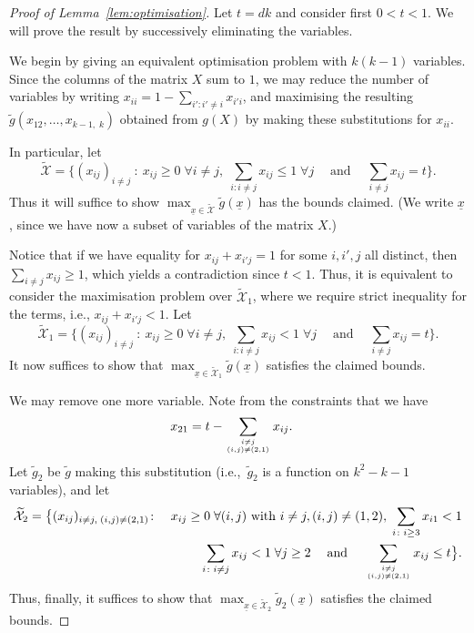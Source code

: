 \documentclass[a4paper,UKenglish,cleveref, autoref, thm-restate,numberwithinsect]{lipics-v2021}
\begin{document}
\begin{proof}[Proof of Lemma~\ref{lem:optimisation}] Let $t=dk$ and consider first $0<t<1$. We will prove the result by successively eliminating the variables. 


We begin by giving an equivalent optimisation problem with $k(k-1)$ variables. Since the columns of the matrix $X$ sum to $1$, we may reduce the number of variables by writing $x_{ii}=1-\sum_{i':i'\neq i} x_{i'i}$, and maximising the resulting $\tilde{g}(x_{12}, \ldots, x_{k-1,\; k})$ obtained from $g(X)$ by making these substitutions for $x_{ii}$. 

In particular, let
%
\begin{equation}
\widetilde{\mathcal{X}}=\big\{(x_{ij})_{i\neq j}
~\colon~ x_{ij}\geq 0 \; \forall i\neq j, \; \sum_{i\colon i\neq j}x_{ij}\leq 1 \; \forall j \; \quad\mbox{and} \quad\;
\label{eq.small_d.X}
\sum_{i\ne j} x_{ij}=t\big\}. \end{equation}
Thus it will suffice to show $\max_{\underline{x} \in \widetilde{\mathcal{X}}} \tilde{g}(\underline{x})$ has the bounds claimed. (We write $\underline{x}$, since we have now a subset of variables of the matrix $X$.)


Notice that 
if we have equality for $x_{ij}+x_{i'j}= 1$ for some $i,i',j$ all distinct, then $\sum_{i\ne j}x_{ij}\geq 1$, which yields a contradiction since $t<1$. Thus, it is equivalent to consider the maximisation problem over $\widetilde{\mathcal{X}}_1$, where we require strict inequality for the terms, i.e., $x_{ij}+x_{i'j}< 1$. Let
%
\begin{equation}
\widetilde{\mathcal{X}}_1=\big\{(x_{ij})_{i\neq j}
~\colon~  x_{ij}\geq 0 \; \forall i\neq j, \; \sum_{i\colon i\neq j}x_{ij} < 1 \; \forall j \; \quad\mbox{and}\quad \;
\label{eq.small_d.X1}
\sum_{i \ne j} x_{ij}=t\big\}. \end{equation}
It now suffices to show that $\max_{\underline{x} \in \widetilde{\mathcal{X}}_1} \tilde{g}(\underline{x})$ satisfies the claimed bounds.

We may remove one more variable. Note
from the constraints that we have \begin{align*}    
x_{21}&=t-\sum_{{i \ne j\atop (i,j)\ne (2,1)}}x_{ij}.\end{align*}
Let $\tilde{g}_2$ be $\tilde{g}$ making this substitution (i.e.,\ $\tilde{g}_2$ is a function on $k^2-k-1$ variables), and let 
%
%
\begin{eqnarray}
\nonumber 
\widetilde{\mathcal{X}}_2=\big\{(x_{ij})_{i\neq j,\; (i,j)\neq (2,1)}
& \colon &  x_{ij}\geq 0 \; \forall (i,j) \text{ with } i\neq j, (i,j)\neq (1,2), \;  \sum_{i\colon i \geq 3}x_{i1} < 1 \\
&& \sum_{i\colon i\neq j}x_{ij} < 1 \; \forall j\geq 2  \; \quad \mbox{and}\quad  \;
\label{eq.small_d.X2}
\sum_{{i \ne j\atop (i,j)\ne (2,1)}} x_{ij} \leq t\big\}. \end{eqnarray}
%
%
Thus, finally, it suffices to show that $\max_{\underline{x} \in \widetilde{\mathcal{X}}_2} \tilde{g}_2(\underline{x})$ satisfies the claimed bounds.






\end{proof}
\end{document}
